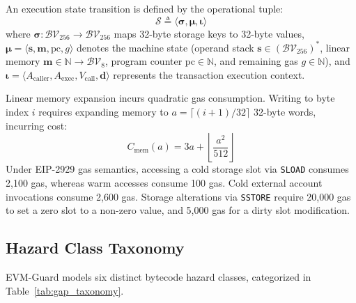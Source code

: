 \documentclass[pdflatex,sn-mathphys]{sn-jnl}
\theoremstyle{thmstyleone}
\theoremstyle{thmstyletwo}
\begin{document}
An execution state transition is defined by the operational tuple:
\begin{equation}
    \mathcal{S} \triangleq \langle \mathbf{\sigma}, \mathbf{\mu}, \mathbf{\iota} \rangle
\end{equation}
where $\mathbf{\sigma}: \mathcal{BV}_{256} \to \mathcal{BV}_{256}$ maps 32-byte storage keys to 32-byte values, $\mathbf{\mu} = \langle \mathbf{s}, \mathbf{m}, \mathrm{pc}, g \rangle$ denotes the machine state (operand stack $\mathbf{s} \in (\mathcal{BV}_{256})^*$, linear memory $\mathbf{m} \in \mathbb{N} \to \mathcal{BV}_{8}$, program counter $\mathrm{pc} \in \mathbb{N}$, and remaining gas $g \in \mathbb{N}$), and $\mathbf{\iota} = \langle A_{\mathrm{caller}}, A_{\mathrm{exec}}, V_{\mathrm{call}}, \mathbf{d} \rangle$ represents the transaction execution context.

Linear memory expansion incurs quadratic gas consumption. Writing to byte index $i$ requires expanding memory to $a = \lceil (i+1)/32 \rceil$ 32-byte words, incurring cost:
\begin{equation}
    C_{\mathrm{mem}}(a) = 3a + \left\lfloor \frac{a^2}{512} \right\rfloor
\end{equation}
Under EIP-2929 gas semantics, accessing a cold storage slot via \texttt{SLOAD} consumes 2,100 gas, whereas warm accesses consume 100 gas. Cold external account invocations consume 2,600 gas. Storage alterations via \texttt{SSTORE} require 20,000 gas to set a zero slot to a non-zero value, and 5,000 gas for a dirty slot modification.

\subsection{Hazard Class Taxonomy}\label{sec:gaps:taxonomy}

EVM-Guard models six distinct bytecode hazard classes, categorized in Table~\ref{tab:gap_taxonomy}.
\end{document}
